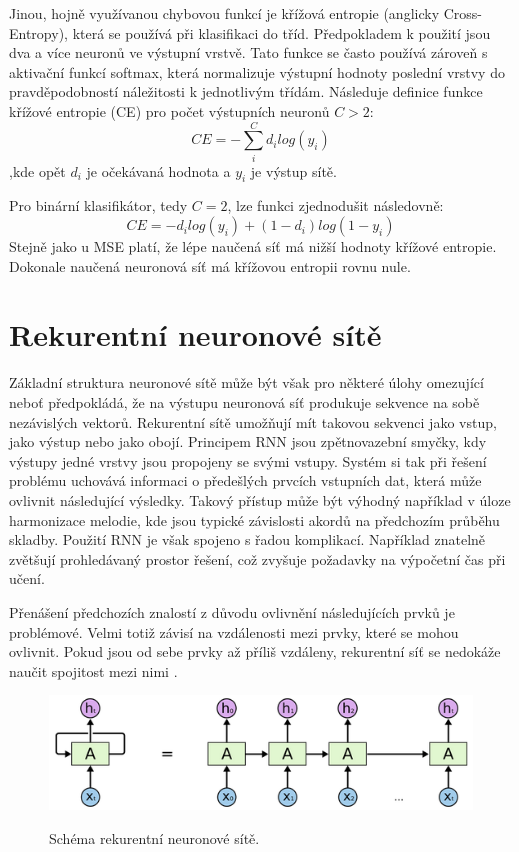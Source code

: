 Jinou, hojně využívanou chybovou funkcí je křížová entropie
(anglicky Cross-Entropy),
která se používá při klasifikaci do tříd.
Předpokladem k použití jsou dva a více neuronů ve výstupní vrstvě.
Tato funkce se často používá zároveň s aktivační funkcí softmax,
která normalizuje výstupní hodnoty poslední vrstvy 
do pravděpodobností náležitosti k jednotlivým třídám.
Následuje definice funkce křížové entropie (CE) pro počet výstupních neuronů $C > 2$:
\begin{equation}
    CE = - \sum^C_i d_i log(y_i)
\end{equation}
,kde opět $d_i$ je očekávaná hodnota a $y_i$ je výstup sítě.
\par

Pro binární klasifikátor, tedy $C = 2$, lze funkci zjednodušit následovně:
\begin{equation}
    CE = - d_i log(y_i) + (1 - d_i) log(1 - y_i)
\end{equation}
Stejně jako u MSE platí, že lépe naučená síť má nižší hodnoty křížové entropie.
Dokonale naučená neuronová síť má křížovou entropii rovnu nule.

\section{Rekurentní neuronové sítě}
Základní struktura neuronové sítě může být však pro některé úlohy omezující 
neboť předpokládá, že na výstupu neuronová síť produkuje sekvence na sobě nezávislých vektorů.
Rekurentní sítě umožňují mít takovou sekvenci jako vstup, 
jako výstup nebo jako obojí.
Principem RNN jsou zpětnovazební smyčky, kdy výstupy jedné vrstvy jsou
propojeny se svými vstupy.
Systém si tak při řešení problému uchovává informaci
o předešlých prvcích vstupních dat,
která může ovlivnit následující výsledky\cite{Karpathy_RNNs}.
Takový přístup může být výhodný například
v úloze harmonizace melodie,
kde jsou typické závislosti akordů na předchozím průběhu skladby.
Použití RNN je však spojeno s řadou komplikací.
Například znatelně zvětšují prohledávaný prostor řešení,
což zvyšuje požadavky na výpočetní čas při učení.
\par
Přenášení předchozích znalostí z důvodu ovlivnění 
následujících prvků je problémové.
Velmi totiž závisí na vzdálenosti mezi prvky,
které se mohou ovlivnit.
Pokud jsou od sebe prvky až příliš vzdáleny,
rekurentní síť se nedokáže naučit spojitost mezi nimi
\cite{colah_lstm}.

\begin{figure}[h]\centering
    \centering
    \includegraphics[width=0.6\linewidth]{obrazky/RNNSchema.png}\\[1pt]  
    \caption{Schéma rekurentní neuronové sítě. \cite{colah_lstm}}    
    \label{obrazekSchemaRekurentniNeuronoveSite}
\end{figure}

